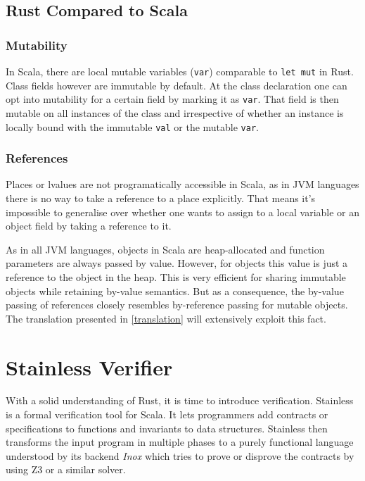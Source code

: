 \subsection{Rust Compared to Scala}

\subsubsection{Mutability}

In Scala, there are local mutable variables (\passthrough{\lstinline!var!})
comparable to \passthrough{\lstinline!let mut!} in Rust. Class fields however
are immutable by default. At the class declaration one can opt into mutability
for a certain field by marking it as \lstinline!var!. That field is then mutable
on all instances of the class and irrespective of whether an instance is locally
bound with the immutable \lstinline!val! or the mutable \lstinline!var!.

\subsubsection{References}

Places or lvalues are not programatically accessible in Scala, as in JVM
languages there is no way to take a reference to a place explicitly. That means
it's impossible to generalise over whether one wants to assign to a local
variable or an object field by taking a reference to it.

As in all JVM languages, objects in Scala are heap-allocated and function
parameters are always passed by value. However, for objects this value is just a
reference to the object in the heap. This is very efficient for sharing
immutable objects while retaining by-value semantics. But as a consequence, the
by-value passing of references closely resembles by-reference passing for
mutable objects. The translation presented in \autoref{translation} will
extensively exploit this fact.





\section{Stainless Verifier}

With a solid understanding of Rust, it is time to introduce verification.
Stainless \cite{stainless} is a formal verification tool for Scala. It lets
programmers add contracts or specifications to functions and invariants to data
structures. Stainless then transforms the input program in multiple phases to a
purely functional language understood by its backend \emph{Inox} \cite{inox}
which tries to prove or disprove the contracts by using Z3 \cite{z3} or a
similar solver.

